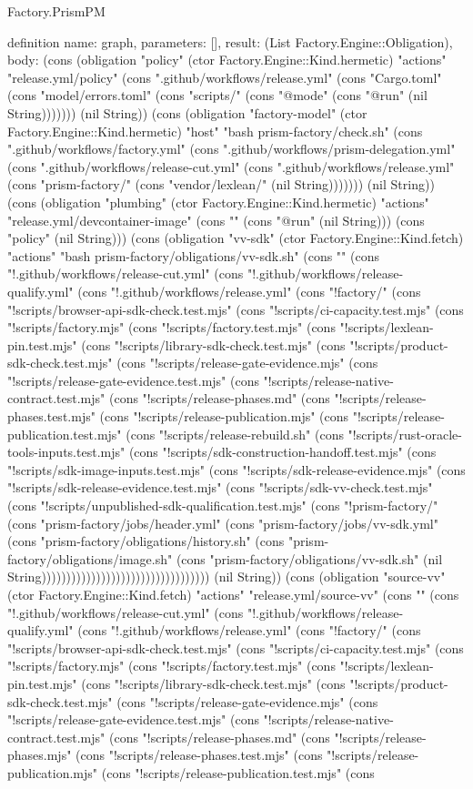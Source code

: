 \begin{lexlean}{Factory.PrismPM}
\begin{semanticmodule}
definition{
  name: graph,
  parameters: [],
  result: (List Factory.Engine::Obligation),
  body: (cons (obligation "policy" (ctor Factory.Engine::Kind.hermetic) "actions" "release.yml/policy" (cons ".github/workflows/release.yml" (cons "Cargo.toml" (cons "model/errors.toml" (cons "scripts/" (cons "@mode" (cons "@run" (nil String))))))) (nil String)) (cons (obligation "factory-model" (ctor Factory.Engine::Kind.hermetic) "host" "bash prism-factory/check.sh" (cons ".github/workflows/factory.yml" (cons ".github/workflows/prism-delegation.yml" (cons ".github/workflows/release-cut.yml" (cons ".github/workflows/release.yml" (cons "prism-factory/" (cons "vendor/lexlean/" (nil String))))))) (nil String)) (cons (obligation "plumbing" (ctor Factory.Engine::Kind.hermetic) "actions" "release.yml/devcontainer-image" (cons "" (cons "@run" (nil String))) (cons "policy" (nil String))) (cons (obligation "vv-sdk" (ctor Factory.Engine::Kind.fetch) "actions" "bash prism-factory/obligations/vv-sdk.sh" (cons "" (cons "!.github/workflows/release-cut.yml" (cons "!.github/workflows/release-qualify.yml" (cons "!.github/workflows/release.yml" (cons "!factory/" (cons "!scripts/browser-api-sdk-check.test.mjs" (cons "!scripts/ci-capacity.test.mjs" (cons "!scripts/factory.mjs" (cons "!scripts/factory.test.mjs" (cons "!scripts/lexlean-pin.test.mjs" (cons "!scripts/library-sdk-check.test.mjs" (cons "!scripts/product-sdk-check.test.mjs" (cons "!scripts/release-gate-evidence.mjs" (cons "!scripts/release-gate-evidence.test.mjs" (cons "!scripts/release-native-contract.test.mjs" (cons "!scripts/release-phases.md" (cons "!scripts/release-phases.test.mjs" (cons "!scripts/release-publication.mjs" (cons "!scripts/release-publication.test.mjs" (cons "!scripts/release-rebuild.sh" (cons "!scripts/rust-oracle-tools-inputs.test.mjs" (cons "!scripts/sdk-construction-handoff.test.mjs" (cons "!scripts/sdk-image-inputs.test.mjs" (cons "!scripts/sdk-release-evidence.mjs" (cons "!scripts/sdk-release-evidence.test.mjs" (cons "!scripts/sdk-vv-check.test.mjs" (cons "!scripts/unpublished-sdk-qualification.test.mjs" (cons "!prism-factory/" (cons "prism-factory/jobs/header.yml" (cons "prism-factory/jobs/vv-sdk.yml" (cons "prism-factory/obligations/history.sh" (cons "prism-factory/obligations/image.sh" (cons "prism-factory/obligations/vv-sdk.sh" (nil String)))))))))))))))))))))))))))))))))) (nil String)) (cons (obligation "source-vv" (ctor Factory.Engine::Kind.fetch) "actions" "release.yml/source-vv" (cons "" (cons "!.github/workflows/release-cut.yml" (cons "!.github/workflows/release-qualify.yml" (cons "!.github/workflows/release.yml" (cons "!factory/" (cons "!scripts/browser-api-sdk-check.test.mjs" (cons "!scripts/ci-capacity.test.mjs" (cons "!scripts/factory.mjs" (cons "!scripts/factory.test.mjs" (cons "!scripts/lexlean-pin.test.mjs" (cons "!scripts/library-sdk-check.test.mjs" (cons "!scripts/product-sdk-check.test.mjs" (cons "!scripts/release-gate-evidence.mjs" (cons "!scripts/release-gate-evidence.test.mjs" (cons "!scripts/release-native-contract.test.mjs" (cons "!scripts/release-phases.md" (cons "!scripts/release-phases.mjs" (cons "!scripts/release-phases.test.mjs" (cons "!scripts/release-publication.mjs" (cons "!scripts/release-publication.test.mjs" (cons }
\end{semanticmodule}
\end{lexlean}
